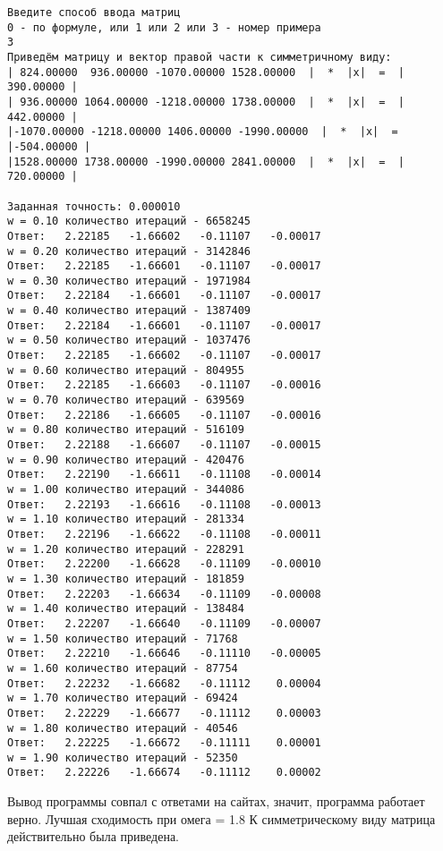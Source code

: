 \documentclass[a4paper,12pt,titlepage,finall]{article}
\begin{document}
\begin{verbatim}
Введите способ ввода матриц
0 - по формуле, или 1 или 2 или 3 - номер примера
3
Приведём матрицу и вектор правой части к симметричному виду:
| 824.00000  936.00000 -1070.00000 1528.00000  |  *  |x|  =  | 390.00000 |
| 936.00000 1064.00000 -1218.00000 1738.00000  |  *  |x|  =  | 442.00000 |
|-1070.00000 -1218.00000 1406.00000 -1990.00000  |  *  |x|  =  |-504.00000 |
|1528.00000 1738.00000 -1990.00000 2841.00000  |  *  |x|  =  | 720.00000 |

Заданная точность: 0.000010
w = 0.10 количество итераций - 6658245
Ответ:   2.22185   -1.66602   -0.11107   -0.00017 
w = 0.20 количество итераций - 3142846
Ответ:   2.22185   -1.66601   -0.11107   -0.00017 
w = 0.30 количество итераций - 1971984
Ответ:   2.22184   -1.66601   -0.11107   -0.00017 
w = 0.40 количество итераций - 1387409
Ответ:   2.22184   -1.66601   -0.11107   -0.00017 
w = 0.50 количество итераций - 1037476
Ответ:   2.22185   -1.66602   -0.11107   -0.00017 
w = 0.60 количество итераций - 804955
Ответ:   2.22185   -1.66603   -0.11107   -0.00016 
w = 0.70 количество итераций - 639569
Ответ:   2.22186   -1.66605   -0.11107   -0.00016 
w = 0.80 количество итераций - 516109
Ответ:   2.22188   -1.66607   -0.11107   -0.00015 
w = 0.90 количество итераций - 420476
Ответ:   2.22190   -1.66611   -0.11108   -0.00014 
w = 1.00 количество итераций - 344086
Ответ:   2.22193   -1.66616   -0.11108   -0.00013 
w = 1.10 количество итераций - 281334
Ответ:   2.22196   -1.66622   -0.11108   -0.00011 
w = 1.20 количество итераций - 228291
Ответ:   2.22200   -1.66628   -0.11109   -0.00010 
w = 1.30 количество итераций - 181859
Ответ:   2.22203   -1.66634   -0.11109   -0.00008 
w = 1.40 количество итераций - 138484
Ответ:   2.22207   -1.66640   -0.11109   -0.00007 
w = 1.50 количество итераций - 71768
Ответ:   2.22210   -1.66646   -0.11110   -0.00005 
w = 1.60 количество итераций - 87754
Ответ:   2.22232   -1.66682   -0.11112    0.00004 
w = 1.70 количество итераций - 69424
Ответ:   2.22229   -1.66677   -0.11112    0.00003 
w = 1.80 количество итераций - 40546
Ответ:   2.22225   -1.66672   -0.11111    0.00001 
w = 1.90 количество итераций - 52350
Ответ:   2.22226   -1.66674   -0.11112    0.00002

\end{verbatim}


Вывод программы совпал с ответами на сайтах, значит, программа работает верно.
Лучшая сходимость при омега = 1.8
К симметрическому виду матрица действительно была приведена.
\end{document}
